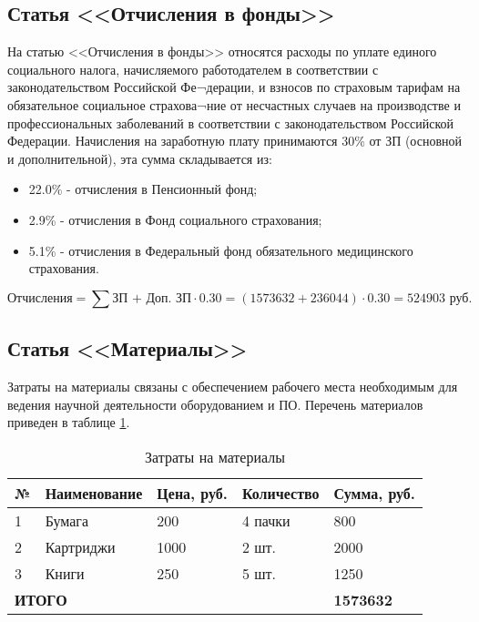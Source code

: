 \subsection{Статья <<Отчисления в фонды>>}
На статью <<Отчисления в фонды>> относятся расходы по уплате единого социального налога, начисляемого работодателем в соответствии с законодательством Российской Фе¬дерации, и взносов по страховым тарифам на обязательное социальное страхова¬ние от несчастных случаев на производстве и профессиональных заболеваний в соответствии с законодательством Российской Федерации. Начисления на заработную плату принимаются 30\% от ЗП (основной и дополнительной), эта сумма складывается из:
\begin{itemize}
	\item 22.0\% - отчисления в Пенсионный фонд;
	\item 2.9\% - отчисления в Фонд социального страхования;
	\item 5.1\% - отчисления в Федеральный фонд обязательного медицинского страхования.
\end{itemize}
$$\text{Отчисления} = \sum \text{ЗП + Доп. ЗП} \cdot 0.30 = (1573632+236044) \cdot 0.30 = 524903 \text{ руб.} $$

\subsection{Статья <<Материалы>>}
Затраты на материалы связаны с обеспечением рабочего места необходимым для ведения научной деятельности оборудованием и ПО. Перечень материалов приведен в таблице \ref{tab:econ_materials}.

\begin{table}[h]
	\begin{center}
		\caption{Затраты на материалы}
		\begin{tabular}{|l|l|l|l|l|}
		\hline
№ & Наименование & Цена, руб. & Количество & Сумма, руб. \\ \hline
1 & Бумага & 200 & 4 пачки & 800 \\ \hline
2 & Картриджи & 1000 & 2 шт. & 2000 \\ \hline
3 & Книги & 250 & 5 шт. & 1250 \\ \hline
 \multicolumn{4}{|p{100mm}|}{\textbf{ИТОГО}} & \textbf{1573632} \\
 \hline
		\end{tabular}
		\label{tab:econ_materials}
	\end{center}
\end{table}

